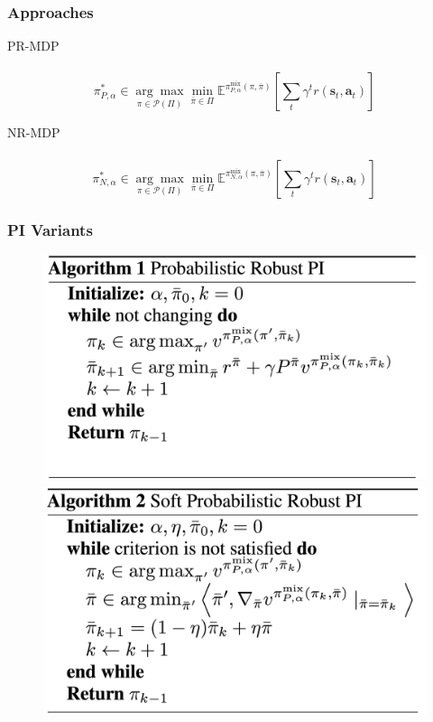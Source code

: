 \documentclass{beamer}
\begin{document}
\begin{frame}
    \frametitle{Approaches}

    PR-MDP \\\\
    \begin{equation}
        \pi_{P, \alpha}^{*} \in \underset{\pi \in \mathcal{P}(\Pi)}{\arg \max } \min _{\overline{\pi} \in \Pi} \mathbb{E}^{\pi_{P, \alpha}^{\operatorname{mix}}(\pi, \overline{\pi})}\left[\sum_{t} \gamma^{t} r\left(\mathbf{s}_{t}, \mathbf{a}_{t}\right)\right]
    \end{equation}
    
    NR-MDP \\\\
    \begin{equation}
        \pi_{N, \alpha}^{*} \in \underset{\pi \in \mathcal{P}(\Pi)}{\arg \max } \min _{\overline{\pi} \in \Pi} \mathbb{E}^{\pi_{N, \alpha}^{\operatorname{mix}}(\pi, \overline{\pi})}\left[\sum_{t} \gamma^{t} r\left(\mathbf{s}_{t}, \mathbf{a}_{t}\right)\right]
    \end{equation}
  \end{frame}



\begin{frame}
    \frametitle{PI Variants}
        \begin{figure}
            \centering
            \includegraphics[scale=0.115]{alg1.png}
    	    \includegraphics[scale=0.115]{alg2.png}
            \label{fig:my_label}
        \end{figure}
    	
\end{frame}
\end{document}
